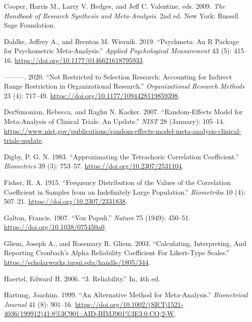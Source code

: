 \documentclass[
  letterpaper,
  DIV=11,
  numbers=noendperiod]{scrreprt}
\newlength{\cslhangindent}
\newlength{\cslentryspacingunit} %
\newenvironment{CSLReferences}[2] %
 {%
  \setlength{\parindent}{0pt}
  \ifodd #1
  \let\oldpar\par
  \def\par{\hangindent=\cslhangindent\oldpar}
  \fi
  \setlength{\parskip}{#2\cslentryspacingunit}
 }%
 {}
\begin{document}
\begin{CSLReferences}{1}{0}
\leavevmode{}%
Cooper, Harris M., Larry V. Hedges, and Jeff C. Valentine, eds. 2009.
\emph{The Handbook of Research Synthesis and Meta-Analysis}. 2nd ed. New
York: Russell Sage Foundation.

\leavevmode{}%
Dahlke, Jeffrey A., and Brenton M. Wiernik. 2019. {``Psychmeta: An R
Package for Psychometric Meta-Analysis.''} \emph{Applied Psychological
Measurement} 43 (5): 415--16.
\url{https://doi.org/10.1177/0146621618795933}.

\leavevmode{}%
---------. 2020. {``Not Restricted to Selection Research: Accounting for
Indirect Range Restriction in Organizational Research.''}
\emph{Organizational Research Methods} 23 (4): 717--49.
\url{https://doi.org/10.1177/1094428119859398}.

\leavevmode{}%
DerSimonian, Rebecca, and Raghu N. Kacker. 2007. {``Random-Effects Model
for Meta-Analysis of Clinical Trials: An Update.''} \emph{NIST} 28
(January): 105--14.
\url{https://www.nist.gov/publications/random-effects-model-meta-analysis-clinical-trials-update}.

\leavevmode{}%
Digby, P. G. N. 1983. {``Approximating the Tetrachoric Correlation
Coefficient.''} \emph{Biometrics} 39 (3): 753--57.
\url{https://doi.org/10.2307/2531104}.

\leavevmode{}%
Fisher, R. A. 1915. {``Frequency Distribution of the Values of the
Correlation Coefficient in Samples from an Indefinitely Large
Population.''} \emph{Biometrika} 10 (4): 507--21.
\url{https://doi.org/10.2307/2331838}.

\leavevmode{}%
Galton, Francis. 1907. {``Vox Populi.''} \emph{Nature} 75 (1949):
450--51. \url{https://doi.org/10.1038/075450a0}.

\leavevmode{}%
Gliem, Joseph A., and Rosemary R. Gliem. 2003. {``Calculating,
Interpreting, And Reporting Cronbach{'}s Alpha Reliability Coefficient
For Likert-Type Scales.''}
\url{https://scholarworks.iupui.edu/handle/1805/344}.

\leavevmode{}%
Haertel, Edward H. 2006. {``3. Reliability.''} In, 4th ed.

\leavevmode{}%
Hartung, Joachim. 1999. {``An Alternative Method for Meta-Analysis.''}
\emph{Biometrical Journal} 41 (8): 901--16.
\url{https://doi.org/10.1002/(SICI)1521-4036(199912)41:8\%3C901::AID-BIMJ901\%3E3.0.CO;2-W}.


\end{CSLReferences}
\end{document}
